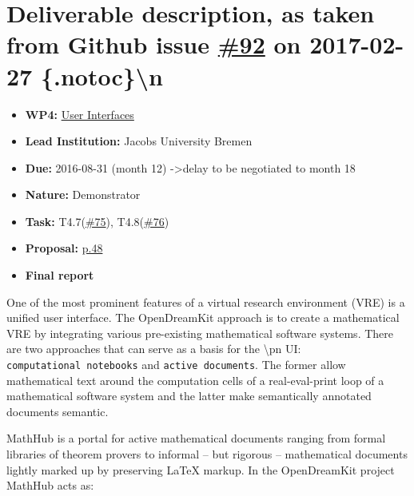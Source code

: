 \section*{\texorpdfstring{Deliverable description, as taken from Github
issue
\href{https://github.com/OpenDreamKit/OpenDreamKit/issues/92}{\#92} on
2017-02-27
\{.notoc\}\textbackslash{}n}{Deliverable description, as taken from Github issue \#92 on 2017-02-27 \{.notoc\}\textbackslash{}n}}\label{deliverable-description-as-taken-from-github-issue-92-on-2017-02-27-.notocn}

\begin{itemize}
\tightlist
\item
  \textbf{WP4:}
  \href{https://github.com/OpenDreamKit/OpenDreamKit/tree/master/WP4}{User
  Interfaces}
\item
  \textbf{Lead Institution:} Jacobs University Bremen
\item
  \textbf{Due:} 2016-08-31 (month 12) -\textgreater{}delay to be
  negotiated to month 18
\item
  \textbf{Nature:} Demonstrator
\item
  \textbf{Task:}
  T4.7(\href{https://github.com/OpenDreamKit/OpenDreamKit/issues/75}{\#75}),
  T4.8(\href{https://github.com/OpenDreamKit/OpenDreamKit/issues/76}{\#76})
\item
  \textbf{Proposal:}
  \href{https://github.com/OpenDreamKit/OpenDreamKit/raw/master/Proposal/proposal-www.pdf}{p.48}
\item
  \textbf{Final report}
\end{itemize}

One of the most prominent features of a virtual research environment
(VRE) is a unified user interface. The OpenDreamKit approach is to
create a mathematical VRE by integrating various pre-existing
mathematical software systems. There are two approaches that can serve
as a basis for the \textbackslash{}pn UI:
\texttt{computational\ notebooks} and \texttt{active\ documents}. The
former allow mathematical text around the computation cells of a
real-eval-print loop of a mathematical software system and the latter
make semantically annotated documents semantic.

MathHub is a portal for active mathematical documents ranging from
formal libraries of theorem provers to informal -- but rigorous --
mathematical documents lightly marked up by preserving LaTeX markup. In
the OpenDreamKit project MathHub acts as:

